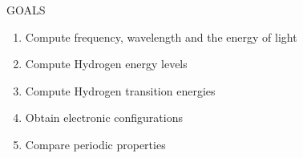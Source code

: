 \documentclass[main.tex]{subfiles}
\begin{document}
\begin{marginfigure}%
\begin{mytcbox}{GOALS}
\begin{enumerate}[label=\protect\circled{\color{white}\arabic*}]
\item Compute frequency, wavelength and the energy of light
\item Compute Hydrogen energy levels  
\item Compute Hydrogen transition energies 
\item Obtain electronic configurations
\item Compare periodic properties
\end{enumerate}
\end{mytcbox}
\end{marginfigure}%
\end{document}

